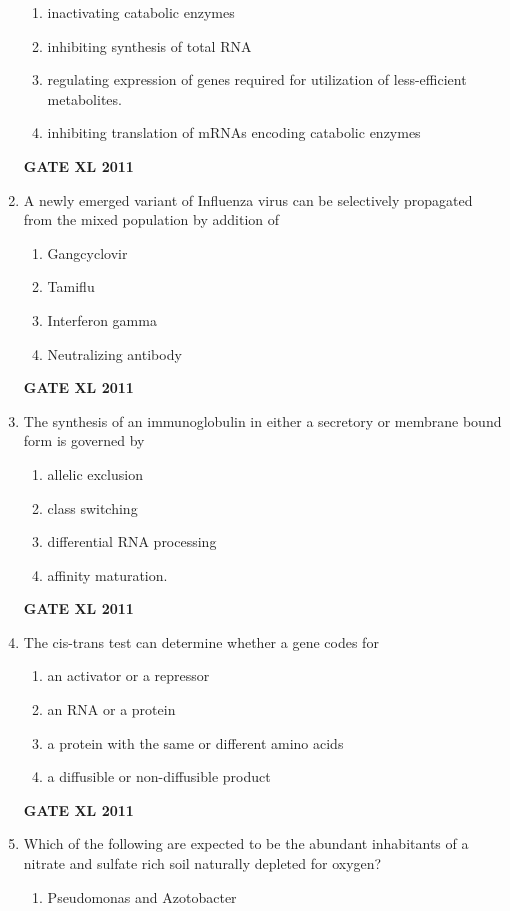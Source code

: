 \documentclass[journal,12pt,onecolumn]{IEEEtran}
\begin{document}
\begin{enumerate}
		\begin{enumerate}
			\item inactivating catabolic enzymes
			\item inhibiting synthesis of total RNA
			\item regulating expression of genes required for utilization of less-efficient metabolites.
			\item inhibiting translation of mRNAs encoding catabolic enzymes
		\end{enumerate}
		\hfill{\textbf{GATE XL 2011}}
	\item {A newly emerged variant of Influenza virus can be selectively propagated from the mixed population by addition of}

		\begin{enumerate}
			\item Gangcyclovir
			\item Tamiflu
			\item Interferon gamma
			\item Neutralizing antibody
		\end{enumerate}
		\hfill{\textbf{GATE XL 2011}}
\item {The synthesis of an immunoglobulin in either a secretory or membrane bound form is governed by}
		\begin{enumerate}
			\item allelic exclusion
			\item class switching
			\item differential RNA processing
			\item affinity maturation.
		\end{enumerate}
		\hfill{\textbf{GATE XL 2011}}
\item {The cis-trans test can determine whether a gene codes for}
		\begin{enumerate}
			\item an activator or a repressor
			\item an RNA or a protein
			\item a protein with the same or different amino acids
			\item a diffusible or non-diffusible product
		\end{enumerate}
		\hfill{\textbf{GATE XL 2011}}
\item {Which of the following are expected to be the abundant inhabitants of a nitrate and sulfate rich soil naturally depleted for oxygen?}
		\begin{enumerate}
			\item Pseudomonas and Azotobacter

\end{enumerate}
\end{enumerate}
\end{document}
